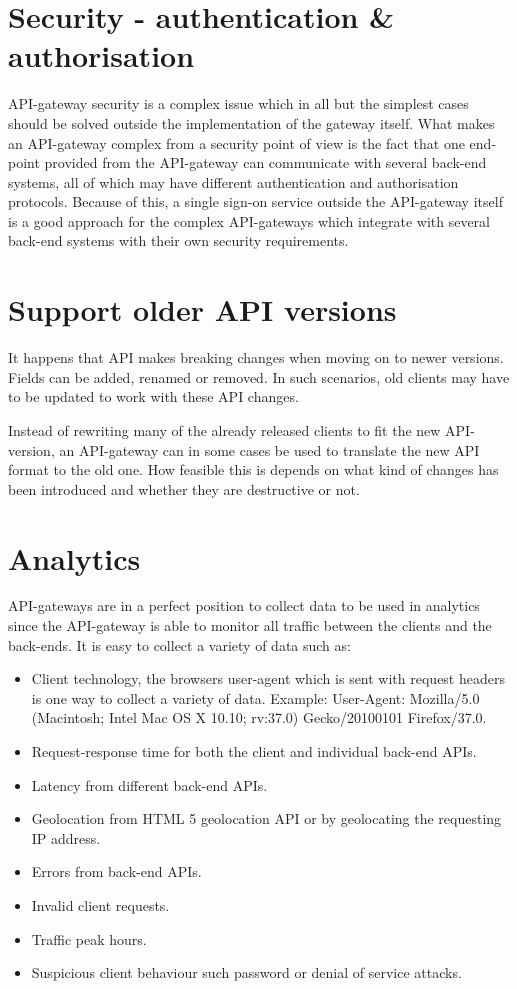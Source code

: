 \documentclass{cslthse-msc}
\begin{document}
\section{Security - authentication \& authorisation}
API-gateway security is a complex issue which in all but the simplest cases should be solved outside the implementation of the gateway itself. What makes an API-gateway complex from a security point of view is the fact that one end-point provided from the API-gateway can communicate with several back-end systems, all of which may have different authentication and authorisation protocols. Because of this, a single sign-on service outside the API-gateway itself is a good approach for the complex API-gateways which integrate with several back-end systems with their own security requirements.

\section{Support older API versions}

It happens that API makes breaking changes when moving on to newer versions. Fields can be added, renamed or removed. In such scenarios, old clients may have to be updated to work with these API changes.

Instead of rewriting many of the already released clients to fit the new API-version, an API-gateway can in some cases be used to translate the new API format to the old one. How feasible this is depends on what kind of changes has been introduced and whether they are destructive or not.

\section{Analytics}

API-gateways are in a perfect position to collect data to be used in analytics since the API-gateway is able to monitor all traffic between the clients and the back-ends. It is easy to collect a variety of data such as:
\begin{itemize}
	\item Client technology, the browsers user-agent which is sent with request headers is one way to collect a variety of data. Example: User-Agent: Mozilla/5.0 (Macintosh; Intel Mac OS X 10.10; rv:37.0) Gecko/20100101 Firefox/37.0.
	\item Request-response time for both the client and individual back-end APIs.
	\item Latency from different back-end APIs.
	\item Geolocation from HTML 5 geolocation API\cite{html5_geolocation} or by geolocating the requesting IP address.
	\item Errors from back-end APIs.
	\item Invalid client requests.
	\item Traffic peak hours.
	\item Suspicious client behaviour such password or denial of service attacks.
\end{itemize}
\end{document}
